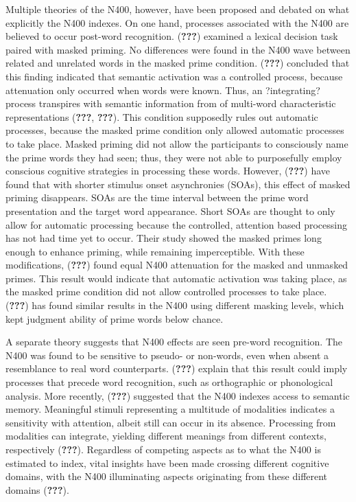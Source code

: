 \documentclass[english,man]{apa6}
\theoremstyle{definition}
\theoremstyle{definition}
\theoremstyle{definition}
\theoremstyle{remark}
\begin{document}
Multiple theories of the N400, however, have been proposed and debated
on what explicitly the N400 indexes. On one hand, processes associated
with the N400 are believed to occur post-word recognition.
({\textbf{???}}) examined a lexical decision task paired with masked
priming. No differences were found in the N400 wave between related and
unrelated words in the masked prime condition. ({\textbf{???}})
concluded that this finding indicated that semantic activation was a
controlled process, because attenuation only occurred when words were
known. Thus, an ?integrating? process transpires with semantic
information from of multi-word characteristic representations
({\textbf{???}}, {\textbf{???}}). This condition supposedly rules out
automatic processes, because the masked prime condition only allowed
automatic processes to take place. Masked priming did not allow the
participants to consciously name the prime words they had seen; thus,
they were not able to purposefully employ conscious cognitive strategies
in processing these words. However, ({\textbf{???}}) have found that
with shorter stimulus onset asynchronies (SOAs), this effect of masked
priming disappears. SOAs are the time interval between the prime word
presentation and the target word appearance. Short SOAs are thought to
only allow for automatic processing because the controlled, attention
based processing has not had time yet to occur. Their study showed the
masked primes long enough to enhance priming, while remaining
imperceptible. With these modifications, ({\textbf{???}}) found equal
N400 attenuation for the masked and unmasked primes. This result would
indicate that automatic activation was taking place, as the masked prime
condition did not allow controlled processes to take place.
({\textbf{???}}) has found similar results in the N400 using different
masking levels, which kept judgment ability of prime words below chance.

A separate theory suggests that N400 effects are seen pre-word
recognition. The N400 was found to be sensitive to pseudo- or non-words,
even when absent a resemblance to real word counterparts.
({\textbf{???}}) explain that this result could imply processes that
precede word recognition, such as orthographic or phonological analysis.
More recently, ({\textbf{???}}) suggested that the N400 indexes access
to semantic memory. Meaningful stimuli representing a multitude of
modalities indicates a sensitivity with attention, albeit still can
occur in its absence. Processing from modalities can integrate, yielding
different meanings from different contexts, respectively
({\textbf{???}}). Regardless of competing aspects as to what the N400 is
estimated to index, vital insights have been made crossing different
cognitive domains, with the N400 illuminating aspects originating from
these different domains ({\textbf{???}}).
\end{document}

